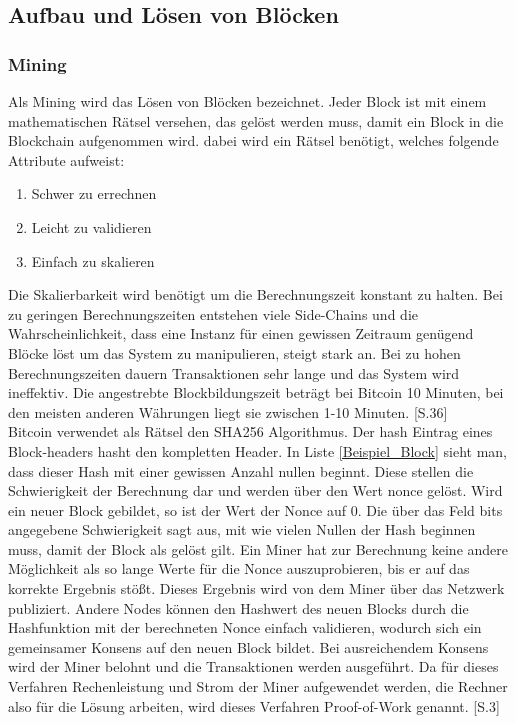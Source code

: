 \subsection{Aufbau und Lösen von Blöcken}
\subsubsection{Mining}
Als Mining wird das Lösen von Blöcken bezeichnet. Jeder Block ist mit einem mathematischen Rätsel versehen, das gelöst werden muss, damit ein Block in die Blockchain aufgenommen wird. dabei wird ein Rätsel benötigt, welches folgende Attribute aufweist: 
\begin{enumerate}
	\item Schwer zu errechnen
	\item Leicht zu validieren
	\item Einfach zu skalieren
\end{enumerate}
Die Skalierbarkeit wird benötigt um die Berechnungszeit konstant zu halten. Bei zu geringen Berechnungszeiten entstehen viele Side-Chains und die Wahrscheinlichkeit, dass eine Instanz für einen gewissen Zeitraum genügend Blöcke löst um das System zu manipulieren, steigt stark an. Bei zu hohen Berechnungszeiten dauern Transaktionen sehr lange und das System wird ineffektiv. Die angestrebte Blockbildungszeit beträgt bei Bitcoin 10 Minuten, bei den meisten anderen Währungen liegt sie zwischen 1-10 Minuten. \cite{Pfnur.2014}[S.36]\\

Bitcoin verwendet als Rätsel den SHA256 Algorithmus. Der \glqq hash\grqq{} Eintrag eines Block-headers hasht den kompletten Header. In Liste \ref{Beispiel_Block} sieht man, dass dieser Hash mit einer gewissen Anzahl nullen beginnt. Diese stellen die Schwierigkeit der Berechnung dar und werden über den Wert \glqq nonce\grqq{} gelöst. Wird ein neuer Block gebildet, so ist der Wert der Nonce auf 0. Die über das Feld \glqq bits\grqq{} angegebene Schwierigkeit sagt aus, mit wie vielen Nullen der Hash beginnen muss, damit der Block als gelöst gilt. Ein Miner hat zur Berechnung keine andere Möglichkeit als so lange Werte für die Nonce auszuprobieren, bis er auf das korrekte Ergebnis stößt. Dieses Ergebnis wird von dem Miner über das Netzwerk publiziert. Andere Nodes können den Hashwert des neuen Blocks durch die Hashfunktion mit der berechneten Nonce einfach validieren, wodurch sich ein gemeinsamer Konsens auf den neuen Block bildet. Bei ausreichendem Konsens wird der Miner belohnt und die Transaktionen werden ausgeführt. Da für dieses Verfahren Rechenleistung und Strom der Miner aufgewendet werden, die Rechner also für die Lösung \glqq arbeiten\grqq{}, wird dieses Verfahren Proof-of-Work genannt. \cite{Nakamoto.31.10.2008}[S.3] \\
 
